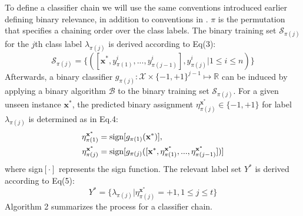 \documentclass[sn-mathphys,Numbered]{sn-jnl}%
\theoremstyle{thmstyleone}%
\theoremstyle{thmstyletwo}%
\theoremstyle{thmstylethree}%
\begin{document}
To define a classifier chain we will use the same conventions introduced earlier defining binary relevance, in addition to conventions in \cite{zhangBinaryRelevanceMultilabel2018}.
$\pi$ is the permutation that specifies a chaining order over the class labels.
The binary training set $\mathcal{S}_{\pi (j)}$ for the $j$th class label $\lambda_{\pi (j)}$ is derived according to Eq(3):
\begin{equation}
\mathcal{S}_{\pi (j)}=\{([\textbf{x}^*,y^i_{\pi (1)},...,y^i_{\pi (j-1)}],y^i_{\pi (j)}|1 \leqslant i \leqslant n)\}
\end{equation}
Afterwards, a binary classifier $g_{\pi (j)}: \mathcal{X} \times\{-1,+1\}^{j-1} \mapsto \mathbb{R}$ can be induced by applying a binary algorithm $\mathcal{B}$ to the binary training set $\mathcal{S}_{\pi (j)}$.
For a given unseen instance $\textbf{x}^*$, the predicted binary assignment $\eta^{\textbf{x}^*}_{\pi (j)}\in \{-1,+1\}$ for label $\lambda_{\pi (j)}$ is determined as in Eq.4:
\begin{align}
\eta^{\textbf{x}^*}_{\pi (1)} &= \textnormal{sign}[g_{\pi (1)}(\textbf{x}^*)], \nonumber \\
\eta^{\textbf{x}^*}_{\pi (j)} &= \textnormal{sign}[g_{\pi (j)}([\textbf{x}^*,\eta^{\textbf{x}^*}_{\pi (1)},...,\eta^{\textbf{x}^*}_{\pi (j-1)}])]
\end{align}
where sign$[\cdot]$ represents the sign function.
The relevant label set $Y^*$ is derived according to Eq(5):
\begin{equation}
Y^*=\{ \lambda_{\pi (j)} | \eta^{\textbf{x}^*}_{\pi (j)}=+1, 1 \leqslant j \leqslant t \}
\end{equation}
Algorithm 2 summarizes the process for a classifier chain.
\end{document}
